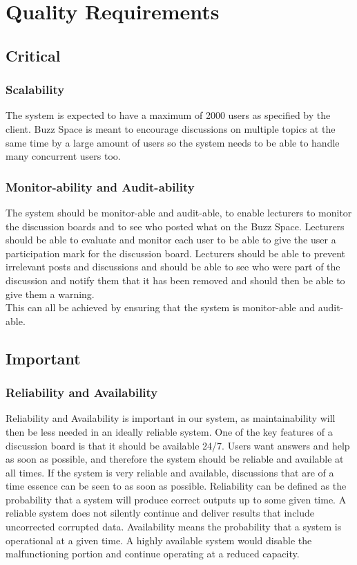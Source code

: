 \section{Quality Requirements}
\subsection{Critical}
\subsubsection{Scalability}
The system is expected to have a maximum of 2000 users as specified by the client. Buzz Space is meant to encourage discussions on multiple topics at the same time by a large amount of users so the system needs to be able to handle many concurrent users too.\\

\subsubsection{Monitor-ability and Audit-ability}

The system should be monitor-able and audit-able, to enable lecturers to monitor the discussion boards and to see who posted what on the Buzz Space. Lecturers should be able to evaluate and monitor each user to be able to give the user a participation mark for the discussion board.  Lecturers should be able to prevent irrelevant posts and discussions and should be able to see who were part of the discussion and notify them that it has been removed and should then be able to give them a warning.\\

This can all be achieved by ensuring that the system is monitor-able and audit-able.\\

\subsection{Important}

\subsubsection{Reliability and Availability}
Reliability and Availability is important in our system, as maintainability will then be less needed in an ideally reliable system. One of the key features of a discussion board is that it should be available 24/7. Users want answers and help as soon as possible, and therefore the system should be reliable and available at all times. If the system is very reliable and available, discussions that are of a time essence can be seen to as soon as possible. Reliability can be defined as the probability that a system will produce correct outputs up to some given time. A reliable system does not silently continue and deliver results that include uncorrected corrupted data. Availability means the probability that a system is operational at a given time. A highly available system would disable the malfunctioning portion and continue operating at a reduced capacity. \\

